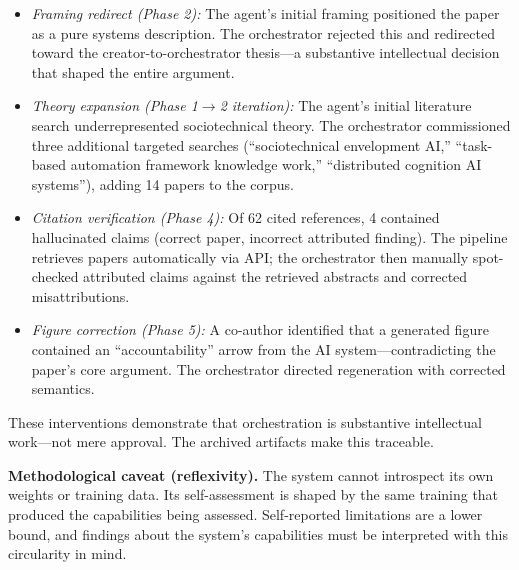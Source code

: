 \documentclass{article}
\begin{document}
\begin{itemize}[nosep]
  \item \textit{Framing redirect (Phase 2):} The agent's initial framing positioned the paper as a pure systems description. The orchestrator rejected this and redirected toward the creator-to-orchestrator thesis---a substantive intellectual decision that shaped the entire argument.
  \item \textit{Theory expansion (Phase 1$\rightarrow$2 iteration):} The agent's initial literature search underrepresented sociotechnical theory. The orchestrator commissioned three additional targeted searches (``sociotechnical envelopment AI,'' ``task-based automation framework knowledge work,'' ``distributed cognition AI systems''), adding 14 papers to the corpus.
  \item \textit{Citation verification (Phase 4):} Of 62 cited references, 4 contained hallucinated claims (correct paper, incorrect attributed finding). The pipeline retrieves papers automatically via API; the orchestrator then manually spot-checked attributed claims against the retrieved abstracts and corrected misattributions.
  \item \textit{Figure correction (Phase 5):} A co-author identified that a generated figure contained an ``accountability'' arrow from the AI system---contradicting the paper's core argument. The orchestrator directed regeneration with corrected semantics.
\end{itemize}

These interventions demonstrate that orchestration is substantive intellectual work---not mere approval. The archived artifacts make this traceable.

\textbf{Methodological caveat (reflexivity).} The system cannot introspect its own weights or training data. Its self-assessment is shaped by the same training that produced the capabilities being assessed. Self-reported limitations are a lower bound, and findings about the system's capabilities must be interpreted with this circularity in mind.


\end{document}
